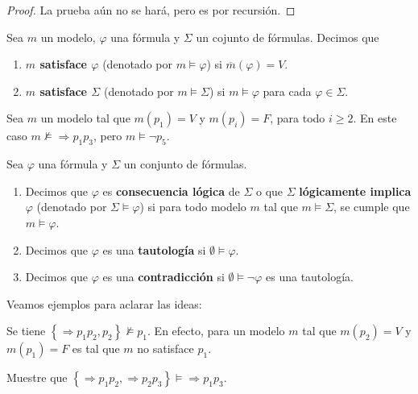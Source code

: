 \documentclass[12pt]{report}
\newcounter{it}
\theoremstyle{largebreak}
\begin{document}
    \begin{proof}
        La prueba aún no se hará, pero es por recursión.
    \end{proof}

    \begin{mydef}
        Sea $m$ un modelo, $\varphi$ una fórmula y $\Sigma$ un cojunto de fórmulas. Decimos que
        \begin{enumerate}
            \item \textbf{$m$ satisface $\varphi$} (denotado por $m\vDash \varphi$) si $\overline{m}(\varphi)=V$.
            \item \textbf{$m$ satisface $\Sigma$} (denotado por $m\vDash \Sigma$) si $m\vDash\varphi$ para cada $\varphi\in\Sigma$.
        \end{enumerate}
    \end{mydef}

    \begin{exa}
        Sea $m$ un modelo tal que $m(p_1)=V$ y $m(p_i)=F$, para todo $i\geq2$. En este caso $m\nvDash \Rightarrow p_1p_3$, pero $m\vDash \neg p_5$.
    \end{exa}

    \begin{mydef}
        Sea $\varphi$ una fórmula y $\Sigma$ un conjunto de fórmulas.
        \begin{enumerate}
            \item Decimos que $\varphi$ es \textbf{consecuencia lógica} de $\Sigma$ o que $\Sigma$ \textbf{lógicamente implica} $\varphi$ (denotado por $\Sigma\vDash\varphi$) si para todo modelo $m$ tal que $m\vDash\Sigma$, se cumple que $m\vDash\varphi$.
            \item Decimos que $\varphi$ es una \textbf{tautología} si $\emptyset\vDash\varphi$.
            \item Decimos que $\varphi$ es una \textbf{contradicción} si $\emptyset\vDash\neg\varphi$ es una tautología.
        \end{enumerate}
    \end{mydef}

    Veamos ejemplos para aclarar las ideas:

    \begin{exa}
        Se tiene $\left\{\Rightarrow p_1p_2,p_2 \right\}\nvDash p_1$. En efecto, para un modelo $m$ tal que $m(p_2)=V$ y $m(p_1)=F$ es tal que $m$ no satisface $p_1$.
    \end{exa}

    \begin{exa}
        Muestre que $\left\{\Rightarrow p_1p_2,\Rightarrow p_2p_3 \right\}\vDash\Rightarrow p_1p_3$.
    \end{exa}
\end{document}
